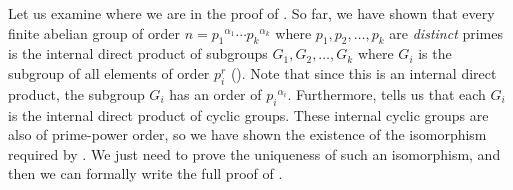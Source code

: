 Let us examine where we are in the proof of . So far, we have shown that every finite abelian group of order $n = {p_1}^{\alpha_1}\cdots{p_k}^{\alpha_k}$ where $p_1, p_2, \dots, p_k$ are \textit{distinct} primes is the internal direct product of subgroups $G_1, G_2, \dots, G_k$ where $G_i$ is the subgroup of all elements of order $p_i^r$ (). Note that since this is an internal direct product, the subgroup $G_i$ has an order of ${p_i}^{\alpha_i}$. Furthermore,  tells us that each $G_i$ is the internal direct product of cyclic groups. These internal cyclic groups are also of prime-power order, so we have shown the existence of the isomorphism required by . We just need to prove the uniqueness of such an isomorphism, and then we can formally write the full proof of .

